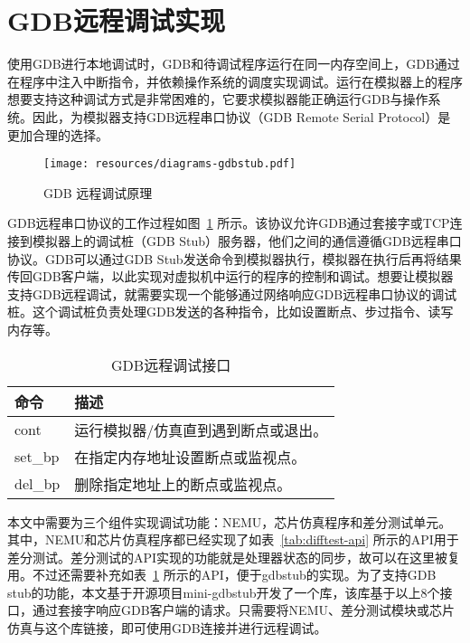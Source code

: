 \section{GDB远程调试实现}



使用GDB进行本地调试时，GDB和待调试程序运行在同一内存空间上，GDB通过在程序中注入中断指令，并依赖操作系统的调度实现调试。运行在模拟器上的程序想要支持这种调试方式是非常困难的，它要求模拟器能正确运行GDB与操作系统。因此，为模拟器支持GDB远程串口协议（GDB Remote Serial Protocol）是更加合理的选择。

\begin{figure}
    \centering
    \texttt{[image: resources/diagrams-gdbstub.pdf]}
    \caption{GDB 远程调试原理}
    \label{fig:gdbremote}
\end{figure}

GDB远程串口协议的工作过程如图~\ref{fig:gdbremote} 所示。该协议允许GDB通过套接字或TCP连接到模拟器上的调试桩（GDB Stub）服务器，他们之间的通信遵循GDB远程串口协议。GDB可以通过GDB Stub发送命令到模拟器执行，模拟器在执行后再将结果传回GDB客户端，以此实现对虚拟机中运行的程序的控制和调试。想要让模拟器支持GDB远程调试，就需要实现一个能够通过网络响应GDB远程串口协议的调试桩。这个调试桩负责处理GDB发送的各种指令，比如设置断点、步过指令、读写内存等。
 
\begin{table}
\centering
\begin{tabular}{|l|p{10cm}|}
\hline
\textbf{命令} & \textbf{描述} \\
\hline
cont & 运行模拟器/仿真直到遇到断点或退出。 \\
\hline
set\_bp & 在指定内存地址设置断点或监视点。 \\
\hline
del\_bp & 删除指定地址上的断点或监视点。 \\
\hline
\end{tabular}
\caption{GDB远程调试接口}
\label{tab:gdbstub-api}
\end{table}

本文中需要为三个组件实现调试功能：NEMU，芯片仿真程序和差分测试单元。其中，NEMU和芯片仿真程序都已经实现了如表~\ref{tab:difftest-api} 所示的API用于差分测试。差分测试的API实现的功能就是处理器状态的同步，故可以在这里被复用。不过还需要补充如表~\ref{tab:gdbstub-api} 所示的API，便于gdbstub的实现。为了支持GDB stub的功能，本文基于开源项目mini-gdbstub开发了一个库，该库基于以上8个接口，通过套接字响应GDB客户端的请求。只需要将NEMU、差分测试模块或芯片仿真与这个库链接，即可使用GDB连接并进行远程调试。

